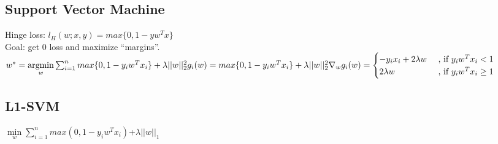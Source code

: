 
\subsection*{Support Vector Machine}
Hinge loss: $l_H(w;x,y) = max \{0,1-y w^T x\}$\\
Goal: get 0 loss and maximize ``margins''.\\
$w^* = \underset{w}{\operatorname{argmin}} \sum_{i=1}^n  max \{0,1-y_i w^T x_i\} + \lambda ||w||_2^2\\
g_i(w) = max \{0,1-y_i w^T x_i\} + \lambda ||w||_2^2\\
\nabla_w g_i(w) = \begin{cases}
    -y_i x_i + 2\lambda w &\text{ , if $y_i w^T x_i<1$}\\
		2\lambda w &\text{ , if $y_i w^T x_i \geq 1$}
\end{cases}$

\subsection*{L1-SVM}
$\underset{w}{\operatorname{min}} \sum_{i=1}^n max(0,1-y_i w^T x_i)$+$\lambda ||w||_1$ 

